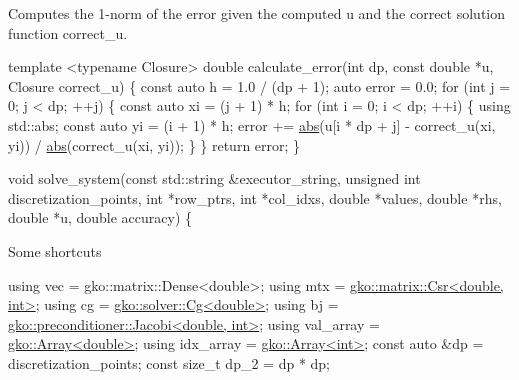 {\ttfamily  Computes the 1-\/norm of the error given the computed {\ttfamily u} and the correct solution function {\ttfamily correct\+\_\+u}.}

{\ttfamily 
\begin{DoxyCode}
\textcolor{keyword}{template} <\textcolor{keyword}{typename} Closure>
\textcolor{keywordtype}{double} calculate\_error(\textcolor{keywordtype}{int} dp, \textcolor{keyword}{const} \textcolor{keywordtype}{double} *u, Closure correct\_u)
\{
    \textcolor{keyword}{const} \textcolor{keyword}{auto} h = 1.0 / (dp + 1);
    \textcolor{keyword}{auto} error = 0.0;
    \textcolor{keywordflow}{for} (\textcolor{keywordtype}{int} j = 0; j < dp; ++j) \{
        \textcolor{keyword}{const} \textcolor{keyword}{auto} xi = (j + 1) * h;
        \textcolor{keywordflow}{for} (\textcolor{keywordtype}{int} i = 0; i < dp; ++i) \{
            \textcolor{keyword}{using} std::abs;
            \textcolor{keyword}{const} \textcolor{keyword}{auto} yi = (i + 1) * h;
            error +=
                \hyperlink{namespacegko_a57797fc0a00fd4b7ff34ca4bfc84bc51}{abs}(u[i * dp + j] - correct\_u(xi, yi)) / \hyperlink{namespacegko_a57797fc0a00fd4b7ff34ca4bfc84bc51}{abs}(correct\_u(xi, yi));
        \}
    \}
    \textcolor{keywordflow}{return} error;
\}


\textcolor{keywordtype}{void} solve\_system(\textcolor{keyword}{const} std::string &executor\_string,
                  \textcolor{keywordtype}{unsigned} \textcolor{keywordtype}{int} discretization\_points, \textcolor{keywordtype}{int} *row\_ptrs,
                  \textcolor{keywordtype}{int} *col\_idxs, \textcolor{keywordtype}{double} *values, \textcolor{keywordtype}{double} *rhs, \textcolor{keywordtype}{double} *u,
                  \textcolor{keywordtype}{double} accuracy)
\{
\end{DoxyCode}
}

{\ttfamily  Some shortcuts}

{\ttfamily 
\begin{DoxyCode}
\textcolor{keyword}{using} vec = gko::matrix::Dense<double>;
\textcolor{keyword}{using} mtx = \hyperlink{classgko_1_1matrix_1_1Csr}{gko::matrix::Csr<double, int>};
\textcolor{keyword}{using} cg = \hyperlink{classgko_1_1solver_1_1Cg}{gko::solver::Cg<double>};
\textcolor{keyword}{using} bj = \hyperlink{classgko_1_1preconditioner_1_1Jacobi}{gko::preconditioner::Jacobi<double, int>};
\textcolor{keyword}{using} val\_array = \hyperlink{classgko_1_1Array}{gko::Array<double>};
\textcolor{keyword}{using} idx\_array = \hyperlink{classgko_1_1Array}{gko::Array<int>};
\textcolor{keyword}{const} \textcolor{keyword}{auto} &dp = discretization\_points;
\textcolor{keyword}{const} \textcolor{keywordtype}{size\_t} dp\_2 = dp * dp;
\end{DoxyCode}
}

